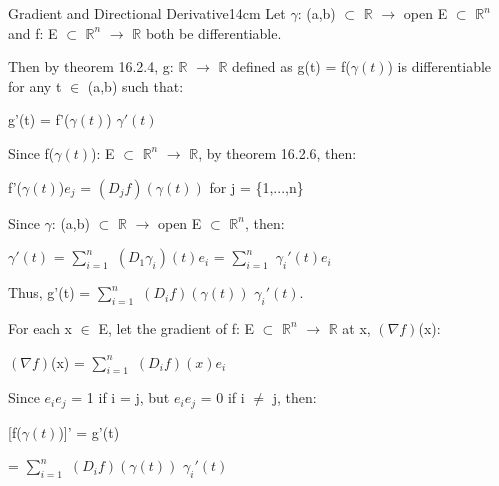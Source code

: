     \newpage



    \begin{definition}{Gradient and Directional Derivative}{14cm}
        Let $\gamma$: (a,b) $\subset$ $\mathbb{R}$
                    $\rightarrow$ open E $\subset$ $\mathbb{R}^n$
        and f: E $\subset$ $\mathbb{R}^n$
                $\rightarrow$ $\mathbb{R}$ both be differentiable.

        Then by {\color{red} theorem 16.2.4},
        g: $\mathbb{R}$ $\rightarrow$ $\mathbb{R}$ 
        defined as g(t) = f($\gamma(t)$)
        is differentiable for any t $\in$ (a,b) such that:
        
        \hspace{0.5cm}
        g'(t) = f'($\gamma(t)$) $\gamma'(t)$

        Since f($\gamma(t)$): E $\subset$ $\mathbb{R}^n$ $\rightarrow$ $\mathbb{R}$,
        by {\color{red} theorem 16.2.6}, then:
        
        \hspace{0.5cm}
        f'($\gamma(t)$)$e_j$ = $(D_jf)(\gamma(t))$
        for j = \{1,...,n\}

        Since $\gamma$: (a,b) $\subset$ $\mathbb{R}$
                    $\rightarrow$ open E $\subset$ $\mathbb{R}^n$,
        then:

        \hspace{0.5cm}
        $\gamma'(t)$
        = $\sum_{i=1}^n$ $(D_1\gamma_i)(t)e_i$
        = $\sum_{i=1}^n$ $\gamma_i'(t)e_i$

        Thus,
        g'(t)
        = $\sum_{i=1}^n$ $(D_if)(\gamma(t))$ $\gamma_i'(t)$.

        \vspace{0.5cm}

        For each x $\in$ E, let the {\color{lblue} gradient} of
        f: E $\subset$ $\mathbb{R}^n$ $\rightarrow$ $\mathbb{R}$ at x,
        $(\nabla f)$(x):
        
        \hspace{0.5cm}
        $(\nabla f)$(x) = $\sum_{i=1}^n$ $(D_if)(x)e_i$

        \vspace{0.5cm}

        Since $e_ie_j$ = 1 if i = j, but $e_ie_j$ = 0 if i $\not =$ j, then:

        \hspace{0.5cm}
        [f($\gamma(t)$)]' = g'(t)
        
        \hspace{2.15cm}
        = $\sum_{i=1}^n$ $(D_if)(\gamma(t))$ $\gamma_i'(t)$


\end{definition}
